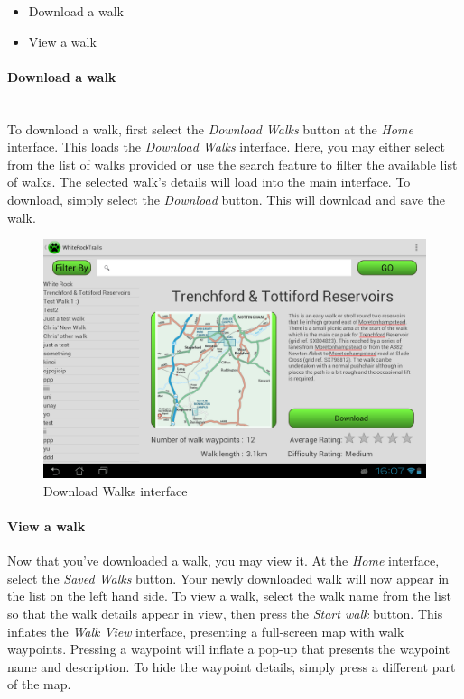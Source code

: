 \documentclass[11pt,a4paper]{report}
\begin{document}
 \begin{itemize}
   \item Download a walk
   \item View a walk
 \end{itemize}
 
\paragraph*{Download a walk}\mbox{}\\

To download a walk, first select the \emph{Download Walks} button at the \emph{Home} interface. This loads the \emph{Download Walks} interface. Here, you may either select from the list of walks provided or use the search feature to filter the available list of walks. The selected walk's details will load into the main interface. To download, simply select the \emph{Download} button. This will download and save the walk.
 
\begin{figure}[H]
\centering
\includegraphics[width=0.8\linewidth]{./img/chris/download_walk}
\caption{Download Walks interface}
\label{fig:download_walk}
\end{figure}

\paragraph*{View a walk}

Now that you've downloaded a walk, you may view it. At the \emph{Home} interface, select the \emph{Saved Walks} button. Your newly downloaded walk will now appear in the list on the left hand side. To view a walk, select the walk name from the list so that the walk details appear in view, then press the \emph{Start walk} button. This inflates the \emph{Walk View} interface, presenting a full-screen map with walk waypoints. Pressing a waypoint will inflate a pop-up that presents the waypoint name and description. To hide the waypoint details, simply press a different part of the map.
\end{document}
